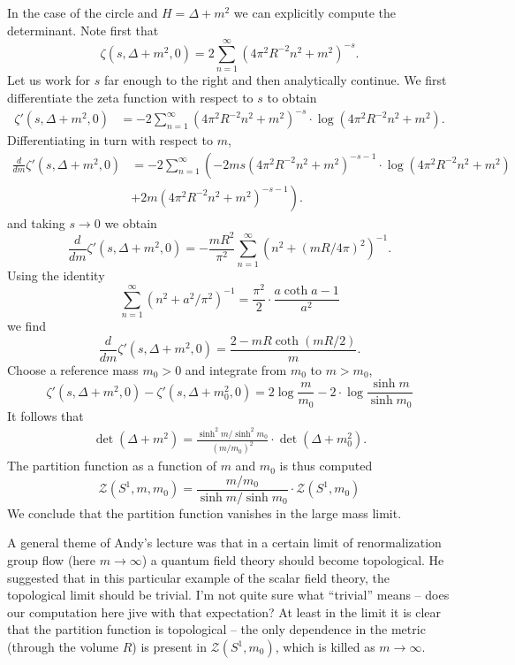 \documentclass{amsart}
\begin{document}
In the case of the circle and $H=\Delta+m^2$ we can explicitly compute the determinant.
Note first that
\begin{equation*}
    \zeta(s,\Delta+m^2,0) = 2\sum_{n=1}^\infty (4\pi^2R^{-2}n^2+m^2)^{-s}.
\end{equation*}
Let us work for $s$ far enough to the right and then analytically continue.
We first differentiate the zeta function with respect to $s$ to obtain
\begin{align*}
    \zeta'(s,\Delta+m^2,0) &= -2\sum_{n=1}^\infty (4\pi^2R^{-2}n^2+m^2)^{-s}
    \cdot \log(4\pi^2R^{-2}n^2+m^2).
\end{align*}
Differentiating in turn with respect to $m$,
\begin{align*}
    \frac{d}{dm}\zeta'(s,\Delta+m^2,0) &= -2\sum_{n=1}^\infty\left(-2ms(4\pi^2R^{-2}n^2+m^2)^{-s-1}
        \cdot\log(4\pi^2R^{-2}n^2+m^2)\right.\\
        & \left. + 2m(4\pi^2R^{-2}n^2+m^2)^{-s-1} \right).
\end{align*}
and taking $s\to0$ we obtain
\begin{equation*}
    \frac{d}{dm}\zeta'(s,\Delta+m^2,0) = -\frac{mR^2}{\pi^2}\sum_{n=1}^\infty (n^2+(mR/4\pi)^2)^{-1}.
\end{equation*}
Using the identity
\begin{equation*}
    \sum_{n=1}^\infty (n^2+a^2/\pi^2)^{-1} = \frac{\pi^2}{2}\cdot \frac{a\coth a-1}{a^2}
\end{equation*}
we find
\begin{equation*}
    \frac{d}{dm}\zeta'(s,\Delta+m^2,0) = \frac{2- mR \coth(mR/2)}{m}.
\end{equation*}
Choose a reference mass $m_0>0$ and integrate from $m_0$ to $m>m_0$,
\begin{equation*}
    \zeta'(s,\Delta+m^2,0)-\zeta'(s,\Delta+m_0^2,0) = 2\log \frac{m}{m_0} - 2 \cdot \log\frac{\sinh m}{\sinh m_0}
\end{equation*}
It follows that
\begin{align*}
    \det(\Delta+m^2) = \frac{\sinh^2m/\sinh^2 m_0}{(m/m_0)^2} \cdot \det(\Delta+m_0^2).
\end{align*}
The partition function as a function of $m$ and $m_0$ is thus computed
\begin{equation*}
    \mathcal{Z}(S^1,m,m_0) = \frac{m/m_0}{\sinh m/\sinh m_0}  \cdot \mathcal{Z}(S^1,m_0)
\end{equation*}
We conclude that the partition function vanishes in the large mass limit.

A general theme of Andy's lecture was that in a certain limit of renormalization
group flow (here $m\to\infty$) a quantum field theory should become topological.
He suggested that in this particular example of the scalar field theory, the topological
limit should be trivial. I'm not quite sure what ``trivial'' means -- does our
computation here jive with that expectation? At least in the limit it is clear
that the partition function is topological -- the only dependence in the metric
(through the volume $R$) is present in $\mathcal{Z}(S^1,m_0)$, which is killed
as $m\to\infty$.




\end{document}
